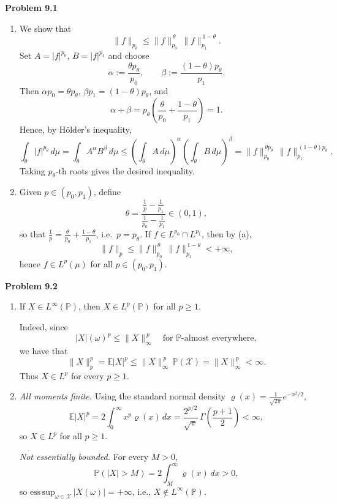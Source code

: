 \documentclass{lecturenotes}
\begin{document}
\textbf{Problem 9.1}
\begin{enumerate}[label={(\alph*)}]
\item We show that
\[
\|f\|_{p_\theta} \le \|f\|_{p_0}^{\,\theta} \, \|f\|_{p_1}^{\,1-\theta}.
\]
Set $A = |f|^{p_0}$, $B = |f|^{p_1}$ and choose
\[
\alpha := \frac{\theta p_\theta}{p_0}, \qquad \beta := \frac{(1-\theta)p_\theta}{p_1}.
\]
Then $\alpha p_0 = \theta p_\theta$, $\beta p_1 = (1-\theta)p_\theta$, and
\[
\alpha + \beta = p_\theta \left( \frac{\theta}{p_0} + \frac{1-\theta}{p_1} \right) = 1.
\]
Hence, by H\"older's inequality,
\[
	\int_\theta |f|^{p_\theta}\,d\mu = \int_\theta A^{\alpha} B^{\beta}\,d\mu
\le \left( \int_\theta A\,d\mu \right)^{\alpha} \left( \int_\theta B\,d\mu \right)^{\beta}
= \|f\|_{p_0}^{\,\theta p_\theta} \, \|f\|_{p_1}^{\,(1-\theta)p_\theta}.
\]
Taking $p_\theta$-th roots gives the desired inequality.

\item Given $p \in (p_0,p_1)$, define
\[
\theta = \frac{\frac{1}{p} - \frac{1}{p_1}}{\frac{1}{p_0} - \frac{1}{p_1}} \in (0,1),
\]
so that $\frac{1}{p} = \frac{\theta}{p_0} + \frac{1-\theta}{p_1}$, i.e.\ $p = p_\theta$.
If $f \in L^{p_0} \cap L^{p_1}$, then by (a),
\[
\|f\|_p \le \|f\|_{p_0}^{\,\theta} \, \|f\|_{p_1}^{\,1-\theta} < +\infty,
\]
hence $f \in L^p(\mu)$ for all $p \in (p_0,p_1)$.
\end{enumerate}

\bigskip

\textbf{Problem 9.2}
\begin{enumerate}[label={(\alph*)}]
	\item If $X \in L^\infty(\mathbb P)$, then $X \in L^p(\mathbb P)$ for all $p \ge 1$.

Indeed, since
\[
|X|(\omega)^p \le \|X\|_\infty^{\,p} \quad \text{for $\mathbb{P}$-almost everywhere},
\]
we have that
\[
	\|X\|_p^p = \mathbb E|X|^p \le \|X\|_\infty^{\,p} \, \mathbb P(\mathcal{X}) 
= \|X\|_\infty^{\,p} < \infty.
\]
Thus $X \in L^p$ for every $p \ge 1$.

\item \emph{All moments finite.} Using the standard normal density 
$\varrho(x) = \tfrac{1}{\sqrt{2\pi}} e^{-x^2/2}$,
\[
\mathbb E|X|^p 
= 2 \int_0^\infty x^p \varrho(x)\,dx
= \frac{2^{p/2}}{\sqrt{\pi}}\, \Gamma\!\left(\frac{p+1}{2}\right) < \infty,
\]
so $X \in L^p$ for all $p \ge 1$.

\emph{Not essentially bounded.} For every $M>0$,
\[
\mathbb P(|X|>M) = 2 \int_M^\infty \varrho(x)\,dx > 0,
\]
so $\mathrm{ess\,sup}_{\omega\in\mathcal{X}}\,|X(\omega)| = +\infty$, i.e., $X \notin L^\infty(\mathbb P)$.
\end{enumerate}
\end{document}
